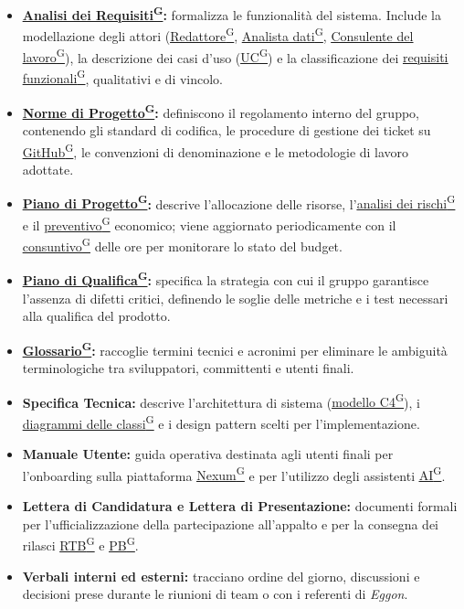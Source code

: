 \documentclass[a4paper,12pt]{article}
\providecommand{\glslink}[2]{\href{https://alittlebyte-19.github.io/Documentazione/glossario.html\#gls-#1}{\underline{#2}\textsuperscript{\scriptsize G}}}
\begin{document}
\begin{itemize}
    \item \textbf{\glslink{analisi-dei-requisiti-adr}{Analisi dei Requisiti}:} formalizza le funzionalità del sistema. Include la modellazione degli attori (\glslink{redattore}{Redattore}, \glslink{analista-dati}{Analista dati}, \glslink{consulente-del-lavoro-cdl}{Consulente del lavoro}), la descrizione dei casi d'uso (\glslink{caso-d-uso-uc}{UC}) e la classificazione dei \glslink{requisiti-funzionali}{requisiti funzionali}, qualitativi e di vincolo.
    \item \textbf{\glslink{norme-di-progetto}{Norme di Progetto}:} definiscono il regolamento interno del gruppo, contenendo gli standard di codifica, le procedure di gestione dei ticket su \glslink{github}{GitHub}, le convenzioni di denominazione e le metodologie di lavoro adottate.
    \item \textbf{\glslink{piano-di-progetto}{Piano di Progetto}:} descrive l'allocazione delle risorse, l'\glslink{analisi-dei-rischi}{analisi dei rischi} e il \glslink{preventivo}{preventivo} economico; viene aggiornato periodicamente con il \glslink{consuntivo}{consuntivo} delle ore per monitorare lo stato del budget.
    \item \textbf{\glslink{piano-di-qualifica}{Piano di Qualifica}:} specifica la strategia con cui il gruppo garantisce l'assenza di difetti critici, definendo le soglie delle metriche e i test necessari alla qualifica del prodotto.
    \item \textbf{\glslink{glossario}{Glossario}:} raccoglie termini tecnici e acronimi per eliminare le ambiguità terminologiche tra sviluppatori, committenti e utenti finali.
    \item \textbf{Specifica Tecnica:} descrive l'architettura di sistema (\glslink{modello-c4}{modello C4}), i \glslink{diagramma-delle-classi-uml}{diagrammi delle classi} e i design pattern scelti per l'implementazione.
    \item \textbf{Manuale Utente:} guida operativa destinata agli utenti finali per l'onboarding sulla piattaforma \glslink{nexum}{Nexum} e per l'utilizzo degli assistenti \glslink{intelligenza-artificiale-ai}{AI}.
    \item \textbf{Lettera di Candidatura e Lettera di Presentazione:} documenti formali per l'ufficializzazione della partecipazione all'appalto e per la consegna dei rilasci \glslink{rtb-requirements-and-technology-baseline}{RTB} e \glslink{pb-product-baseline}{PB}.
    \item \textbf{Verbali interni ed esterni:} tracciano ordine del giorno, discussioni e decisioni prese durante le riunioni di team o con i referenti di \textit{Eggon}.
\end{itemize}
\end{document}
